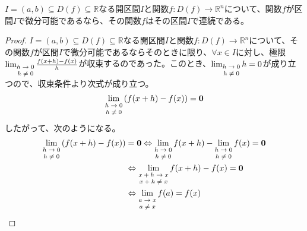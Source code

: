 \documentclass[dvipdfmx]{jsarticle}
\begin{document}
\begin{thm}\label{4.2.1.3}
$I = (a,b) \subseteq D(f) \subseteq \mathbb{R}$なる開区間$I$と関数$f:D(f) \rightarrow \mathbb{R}^{n}$について、関数$f$が区間$I$で微分可能であるなら、その関数$f$はその区間$I$で連続である。
\end{thm}
\begin{proof}
$I = (a,b) \subseteq D(f) \subseteq \mathbb{R}$なる開区間$I$と関数$f:D(f) \rightarrow \mathbb{R}^{n}$について、その関数$f$が区間$I$で微分可能であるならそのときに限り、$\forall x \in I$に対し、極限$\lim_{\scriptsize \begin{matrix}
h \rightarrow 0 \\
h \neq 0 \\
\end{matrix}}\frac{f(x + h) - f(x)}{h}$が収束するのであった。このとき、$\lim_{\scriptsize \begin{matrix}
h \rightarrow 0 \\
h \neq 0 \\
\end{matrix}}h = 0$が成り立つので、収束条件より次式が成り立つ。
\begin{align*}
\lim_{\scriptsize \begin{matrix}
h \rightarrow 0 \\
h \neq 0 \\
\end{matrix}}\left( f(x + h) - f(x) \right) = \mathbf{0}
\end{align*}
したがって、次のようになる。
\begin{align*}
\lim_{\scriptsize \begin{matrix}
h \rightarrow 0 \\
h \neq 0 \\
\end{matrix}}\left( f(x + h) - f(x) \right) &= \mathbf{0} \Leftrightarrow \lim_{\scriptsize \begin{matrix}
h \rightarrow 0 \\
h \neq 0 \\
\end{matrix}}{f(x + h)} - \lim_{\scriptsize \begin{matrix}
h \rightarrow 0 \\
h \neq 0 \\
\end{matrix}}{f(x)} = \mathbf{0}\\
&\Leftrightarrow \lim_{\scriptsize \begin{matrix}
x + h \rightarrow x \\
x + h \neq x \\
\end{matrix}}{f(x + h)} - f(x) = \mathbf{0}\\
&\Leftrightarrow \lim_{\scriptsize \begin{matrix}
a \rightarrow x \\
a \neq x \\
\end{matrix}}{f(a)} = f(x)
\end{align*}
\end{proof}
\end{document}
